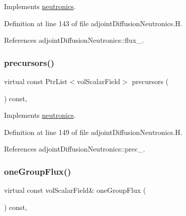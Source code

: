 Implements \hyperlink{classFoam_1_1neutronics_a10f1010740ab17237b99564ef3cb0ba6}{neutronics}.



Definition at line 143 of file adjoint\+Diffusion\+Neutronics.\+H.



References adjoint\+Diffusion\+Neutronics\+::flux\+\_\+.

\mbox{\label{classFoam_1_1adjointDiffusionNeutronics_adff280398fa801b37b673a30623f5afe}} 
\subsubsection{\texorpdfstring{precursors()}{precursors()}}
{\footnotesize\ttfamily virtual const Ptr\+List$<$vol\+Scalar\+Field$>$ precursors (\begin{DoxyParamCaption}{ }\end{DoxyParamCaption}) const\hspace{0.3cm}{\ttfamily [inline]}, {\ttfamily [virtual]}}



Implements \hyperlink{classFoam_1_1neutronics_a9bc58c1b726592572ed3726d56ed41c4}{neutronics}.



Definition at line 149 of file adjoint\+Diffusion\+Neutronics.\+H.



References adjoint\+Diffusion\+Neutronics\+::prec\+\_\+.

\mbox{\label{classFoam_1_1adjointDiffusionNeutronics_a67faa978ebf3e97a9df21f1e37a68a8d}} 
\subsubsection{\texorpdfstring{one\+Group\+Flux()}{oneGroupFlux()}}
{\footnotesize\ttfamily virtual const vol\+Scalar\+Field\& one\+Group\+Flux (\begin{DoxyParamCaption}{ }\end{DoxyParamCaption}) const\hspace{0.3cm}{\ttfamily [inline]}, {\ttfamily [virtual]}}



